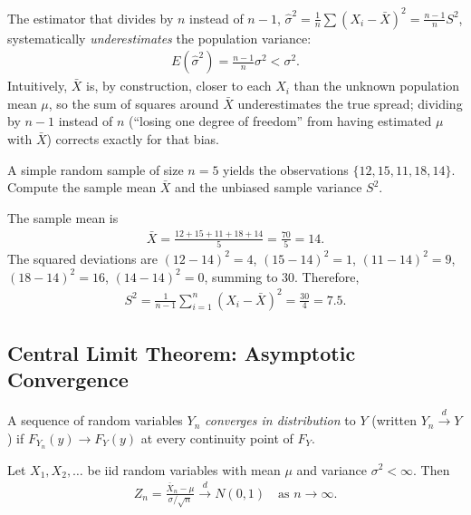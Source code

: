 \begin{observacion}
The estimator that divides by $n$ instead of $n-1$, $\hat{\sigma}^2 = \frac{1}{n}\sum(X_i-\bar{X})^2 = \frac{n-1}{n}S^2$, systematically \emph{underestimates} the population variance:
\begin{align}
 E(\hat{\sigma}^2) = \frac{n-1}{n}\sigma^2 < \sigma^2.
\end{align}
Intuitively, $\bar{X}$ is, by construction, closer to each $X_i$ than the unknown population mean $\mu$, so the sum of squares around $\bar{X}$ underestimates the true spread; dividing by $n-1$ instead of $n$ (``losing one degree of freedom'' from having estimated $\mu$ with $\bar{X}$) corrects exactly for that bias.
\end{observacion}

\begin{ejemplo}
 \label{exmp:sample-mean-and-unbiased-variance}
A simple random sample of size $n=5$ yields the observations $\{12, 15, 11, 18, 14\}$. Compute the sample mean $\bar{X}$ and the unbiased sample variance $S^2$.
\end{ejemplo}

\begin{solucion}
The sample mean is
\begin{align}
 \bar{X} = \frac{12+15+11+18+14}{5} = \frac{70}{5} = 14.
\end{align}
The squared deviations are $(12-14)^2=4$, $(15-14)^2=1$, $(11-14)^2=9$, $(18-14)^2=16$, $(14-14)^2=0$, summing to $30$. Therefore,
\begin{align}
 S^2 = \frac{1}{n-1}\sum_{i=1}^n (X_i-\bar{X})^2 = \frac{30}{4} = 7.5.
\end{align}
\end{solucion}



\subsection{Central Limit Theorem: Asymptotic Convergence}

\begin{definicion}
A sequence of random variables $Y_n$ \emph{converges in distribution} to $Y$ (written $Y_n \xrightarrow{d} Y$) if $F_{Y_n}(y) \to F_Y(y)$ at every continuity point of $F_Y$.
\end{definicion}

\begin{teorema}
 \label{eq:5.2.1}
Let $X_1, X_2, \ldots$ be iid random variables with mean $\mu$ and variance $\sigma^2 < \infty$. Then
\begin{align}
 Z_n = \frac{\bar{X}_n - \mu}{\sigma/\sqrt{n}} \xrightarrow{d} N(0,1)
 \quad \text{as } n \to \infty.
\end{align}
\end{teorema}

